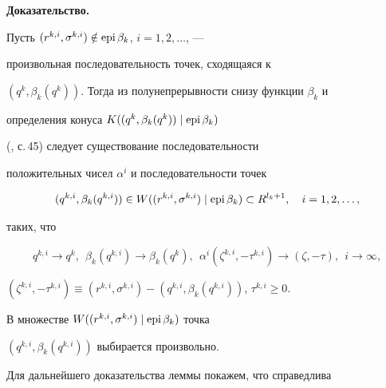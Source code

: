 {\bf Доказательство.}


Пусть $(r^{k,i},\sigma^{k,i})\notin \operatorname{epi}\beta_k$, $i=1,2,\dotsc$, ---


произвольная последовательность точек, сходящаяся к 


$(q^k,\beta_k(q^k))$. Тогда из полунепрерывности снизу функции $\beta_k$ и


определения конуса $K((q^k,\beta_k(q^k))\mid\operatorname{epi}\beta_k)$


(\cite{mordukhovich88}, с.\,45) следует существование последовательности


положительных чисел $\alpha^i$ и последовательности точек


\begin{equation}\label{*}


(q^{k,i},\beta_k(q^{k,i}))\in W((r^{k,i},\sigma^{k,i})\mid\epi\beta_k)


\subset R^{l_k+1},\quad  i=1,2,\dotsc,


\end{equation}


таких, что


\begin{equation}\label{**}


q^{k,i}\to q^k,\ \ \beta_k(q^{k,i})\to\beta_k(q^k),  


\ \ \alpha^i(\zeta^{k,i},-\tau^{k,i})\to(\zeta,-\tau),\ \  i\to\infty,


\end{equation}


$(\zeta^{k,i},-\tau^{k,i})\equiv


(r^{k,i},\sigma^{k,i})-(q^{k,i},\beta_k(q^{k,i}))$, $\tau^{k,i}\geq 0$.


В множестве $W((r^{k,i},\sigma^{k,i})\mid\operatorname{epi}\beta_k)$ точка


$(q^{k,i},\beta_k(q^{k,i}))$ выбирается произвольно.


Для дальнейшего доказательства леммы покажем, что справедлива









